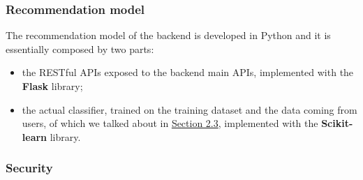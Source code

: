 \documentclass[../../main]{subfiles}
\begin{document}
\subsubsection{Recommendation model}
\label{sss:recommendation-model-development}

The recommendation model of the backend is developed in Python and it is essentially composed by two parts:
\begin{itemize}
    \item the RESTful APIs exposed to the backend main APIs, implemented with the \textbf{Flask} library;
    \item the actual classifier, trained on the training dataset and the data coming from users, of which we talked about in \hyperref[sss:recommendation-model-design]{Section 2.3}, implemented with the \textbf{Scikit-learn} library.
\end{itemize}

\subsubsection{Security}
\label{sss:security}
\end{document}
